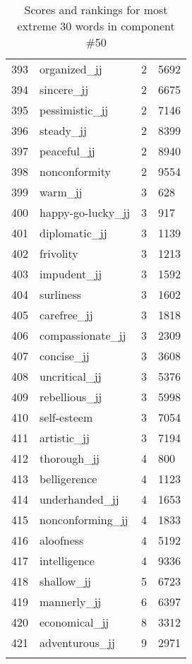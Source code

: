 \begin{longtable}[!htbp]{| rlr@{.}l |}
    393 & organized\_jj & 2 & 5692 \\
    394 & sincere\_jj & 2 & 6675 \\
    395 & pessimistic\_jj & 2 & 7146 \\
    396 & steady\_jj & 2 & 8399 \\
    397 & peaceful\_jj & 2 & 8940 \\
    398 & nonconformity & 2 & 9554 \\
    399 & warm\_jj & 3 & 628 \\
    400 & happy-go-lucky\_jj & 3 & 917 \\
    401 & diplomatic\_jj & 3 & 1139 \\
    402 & frivolity & 3 & 1213 \\
    403 & impudent\_jj & 3 & 1592 \\
    404 & surliness & 3 & 1602 \\
    405 & carefree\_jj & 3 & 1818 \\
    406 & compassionate\_jj & 3 & 2309 \\
    407 & concise\_jj & 3 & 3608 \\
    408 & uncritical\_jj & 3 & 5376 \\
    409 & rebellious\_jj & 3 & 5998 \\
    410 & self-esteem & 3 & 7054 \\
    411 & artistic\_jj & 3 & 7194 \\
    412 & thorough\_jj & 4 & 800 \\
    413 & belligerence & 4 & 1123 \\
    414 & underhanded\_jj & 4 & 1653 \\
    415 & nonconforming\_jj & 4 & 1833 \\
    416 & aloofness & 4 & 5192 \\
    417 & intelligence & 4 & 9336 \\
    418 & shallow\_jj & 5 & 6723 \\
    419 & mannerly\_jj & 6 & 6397 \\
    420 & economical\_jj & 8 & 3312 \\
    421 & adventurous\_jj & 9 & 2971 \\
    \hline
    \caption{Scores and rankings for most extreme 30 words in component \#50} \\
\end{longtable}
